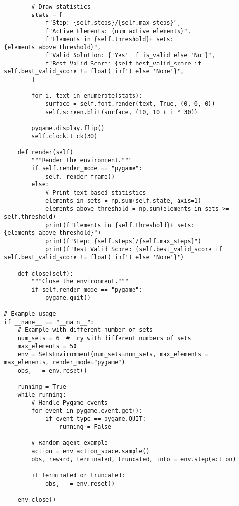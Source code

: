 \begin{lstlisting}
        # Draw statistics
        stats = [
            f"Step: {self.steps}/{self.max_steps}",
            f"Active Elements: {num_active_elements}",
            f"Elements in {self.threshold}+ sets: {elements_above_threshold}",
            f"Valid Solution: {'Yes' if is_valid else 'No'}",
            f"Best Valid Score: {self.best_valid_score if self.best_valid_score != float('inf') else 'None'}",
        ]
        
        for i, text in enumerate(stats):
            surface = self.font.render(text, True, (0, 0, 0))
            self.screen.blit(surface, (10, 10 + i * 30))
        
        pygame.display.flip()
        self.clock.tick(30)
    
    def render(self):
        """Render the environment."""
        if self.render_mode == "pygame":
            self._render_frame()
        else:
            # Print text-based statistics
            elements_in_sets = np.sum(self.state, axis=1)
            elements_above_threshold = np.sum(elements_in_sets >= self.threshold)
            print(f"Elements in {self.threshold}+ sets: {elements_above_threshold}")
            print(f"Step: {self.steps}/{self.max_steps}")
            print(f"Best Valid Score: {self.best_valid_score if self.best_valid_score != float('inf') else 'None'}")
    
    def close(self):
        """Close the environment."""
        if self.render_mode == "pygame":
            pygame.quit()

# Example usage
if __name__ == "__main__":
    # Example with different number of sets
    num_sets = 6  # Try with different numbers of sets
    max_elements = 50
    env = SetsEnvironment(num_sets=num_sets, max_elements = max_elements, render_mode="pygame")
    obs, _ = env.reset()
    
    running = True
    while running:
        # Handle Pygame events
        for event in pygame.event.get():
            if event.type == pygame.QUIT:
                running = False
                
        # Random agent example
        action = env.action_space.sample()
        obs, reward, terminated, truncated, info = env.step(action)
        
        if terminated or truncated:
            obs, _ = env.reset()
            
    env.close()

\end{lstlisting}

